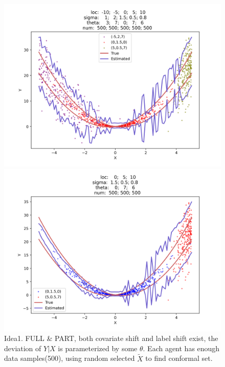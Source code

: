 \documentclass[12pt, a4paper, oneside]{article}
\begin{document}
    \begin{figure}[htbp]
        \centering
        \begin{minipage}{0.495\linewidth}
            \centering
            \includegraphics[width=0.98\linewidth]{fig/Ex1_2/FULL.png}
        \end{minipage}
        \begin{minipage}{0.495\linewidth}
            \centering
            \includegraphics[width=0.98\linewidth]{fig/Ex1_2/PART.png}
        \end{minipage}
        \caption{Idea1. FULL \& PART, both covariate shift and label shift exist, the deviation of $Y|X$ is parameterized by some $\theta$. Each agent has enough data samples(500), using random selected $\tilde{X}$ to find conformal set.}
        \label{Fig5}
    \end{figure}
\end{document}
